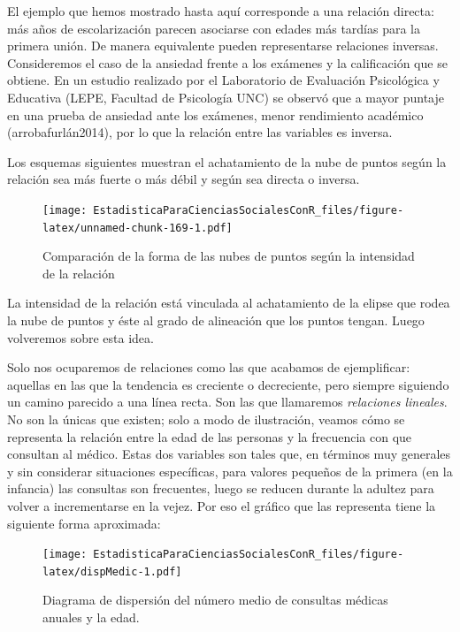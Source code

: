 \documentclass[]{book}
\begin{document}
El ejemplo que hemos mostrado hasta aquí corresponde a una relación directa: más años de escolarización parecen asociarse con edades más tardías para la primera unión. De manera equivalente pueden representarse relaciones inversas. Consideremos el caso de la ansiedad frente a los exámenes y la calificación que se obtiene. En un estudio realizado por el Laboratorio de Evaluación Psicológica y Educativa (LEPE, Facultad de Psicología UNC) se observó que a mayor puntaje en una prueba de ansiedad ante los exámenes, menor rendimiento académico (arrobafurlán2014), por lo que la relación entre las variables es inversa.

Los esquemas siguientes muestran el achatamiento de la nube de puntos según la relación sea más fuerte o más débil y según sea directa o inversa.

\begin{figure}
\centering
\texttt{[image: EstadisticaParaCienciasSocialesConR\_files/figure-latex/unnamed-chunk-169-1.pdf]}
\caption{\label{fig:unnamed-chunk-169}Comparación de la forma de las nubes de puntos según la intensidad de la relación}
\end{figure}

La intensidad de la relación está vinculada al achatamiento de la elipse
que rodea la nube de puntos y éste al grado de alineación que los puntos
tengan. Luego volveremos sobre esta idea.

Solo nos ocuparemos de relaciones como las que acabamos de ejemplificar:
aquellas en las que la tendencia es creciente o decreciente, pero
siempre siguiendo un camino parecido a una línea recta. Son las que
llamaremos \emph{relaciones lineales}. No son la únicas que existen; solo a
modo de ilustración, veamos cómo se representa la relación entre la edad
de las personas y la frecuencia con que consultan al médico. Estas dos
variables son tales que, en términos muy generales y sin considerar
situaciones específicas, para valores pequeños de la primera (en la
infancia) las consultas son frecuentes, luego se reducen durante la
adultez para volver a incrementarse en la vejez. Por eso el gráfico que las representa tiene la siguiente forma aproximada:

\begin{figure}
\centering
\texttt{[image: EstadisticaParaCienciasSocialesConR\_files/figure-latex/dispMedic-1.pdf]}
\caption{\label{fig:dispMedic}Diagrama de dispersión del número medio de consultas médicas anuales y la edad.}
\end{figure}
\end{document}
